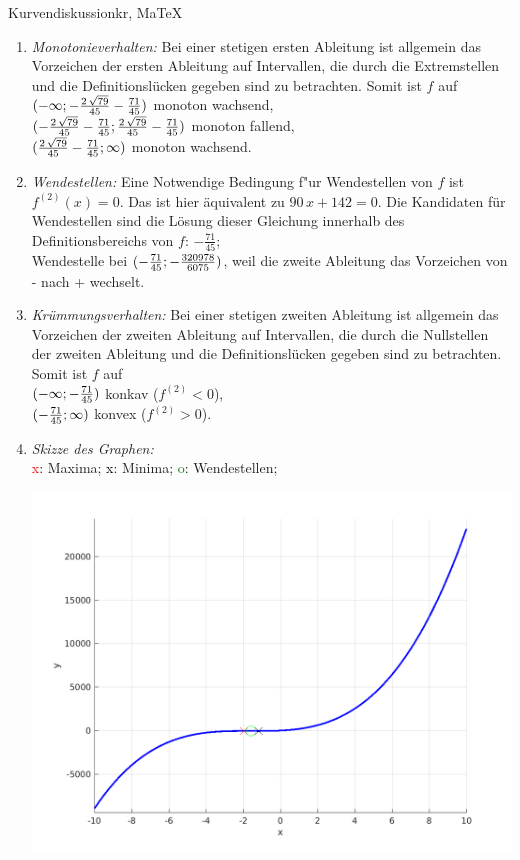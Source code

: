 \begin{MAufgabe}{Kurvendiskussion}{kr, MaTeX}
\begin{enumerate}
 \item \emph{Monotonieverhalten:} 
 Bei einer stetigen ersten Ableitung ist allgemein das Vorzeichen der ersten Ableitung auf Intervallen, die durch die Extremstellen und die Definitionsl\"ucken gegeben sind zu betrachten. Somit ist $f$ auf \\ 
 $(-\infty; - \frac{2\, \sqrt{79}}{45} - \frac{71}{45})$ monoton wachsend, \\ 
 $( - \frac{2\, \sqrt{79}}{45} - \frac{71}{45};\frac{2\, \sqrt{79}}{45} - \frac{71}{45})$ monoton  fallend, \\ 
 $(\frac{2\, \sqrt{79}}{45} - \frac{71}{45}; \infty)$ monoton wachsend. \\ 
 \item \emph{Wendestellen:} 
 Eine Notwendige Bedingung f"ur Wendestellen von $f$ ist $f^{(2)}(x)=0$. 
 Das ist hier \"aquivalent zu $90\, x + 142=0$. 
 Die Kandidaten f\"ur Wendestellen sind die L\"osung dieser Gleichung innerhalb des Definitionsbereichs von $f$: $- \frac{71}{45}$; \\ 
 Wendestelle bei $(- \frac{71}{45};- \frac{320978}{6075})$, weil die zweite Ableitung das Vorzeichen von - nach + wechselt. \\ 
 \item \emph{Kr\"ummungsverhalten:} 
 Bei einer stetigen zweiten Ableitung ist allgemein das Vorzeichen der zweiten Ableitung auf Intervallen, die durch die Nullstellen der zweiten Ableitung und die Definitionsl\"ucken gegeben sind zu betrachten. 
 Somit ist $f$ auf \\ 
 $(-\infty ;- \frac{71}{45})$  konkav ($f^{(2)}<0$), \\ 
 $(- \frac{71}{45}; \infty)$  konvex ($f^{(2)}>0$). \\ 
 \item \emph{Skizze des Graphen:} \\ 
 {\textcolor{red} x}: Maxima; {\textcolor{black} x}: Minima; {\textcolor{green} o}: Wendestellen; 
  \begin{center}
  \includegraphics[width=0.8\linewidth]{Abb_zur_Ag_autogenerated_fractions_31.png} \end{center}
  
 \end{enumerate}
 \else\relax\fi
  \end{MAufgabe}